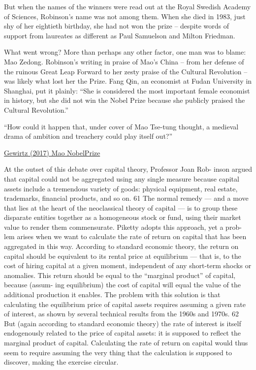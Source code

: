 \documentclass[
]{book}
\begin{document}
But when the names of the winners were read out at the Royal Swedish Academy of Sciences, Robinson's name was not among them. When she died in 1983, just shy of her eightieth birthday, she had not won the prize -- despite words of support from laureates as different as Paul Samuelson and Milton Friedman.

What went wrong? More than perhaps any other factor, one man was to blame: Mao Zedong. Robinson's writing in praise of Mao's China -- from her defense of the ruinous Great Leap Forward to her zesty praise of the Cultural Revolution -- was likely what lost her the Prize. Fang Qin, an economist at Fudan University in Shanghai, put it plainly: ``She is considered the most important female economist in history, but she did not win the Nobel Prize because she publicly praised the Cultural Revolution.''

``How could it happen that, under cover of Mao Tse-tung thought, a medieval drama of ambition and treachery could play itself out?''

\href{https://chinachannel.org/2017/12/13/fellow-travellers-tale/}{Gewirtz (2017) Mao NobelPrize}

At the outset of this debate over capital theory, Professor Joan Rob-
inson argued that capital could not be aggregated using any single
measure because capital assets include a tremendous variety of goods:
physical equipment, real estate, trademarks, financial products, and so
on. 61 The normal remedy --- and a move that lies at the heart of the
neoclassical theory of capital --- is to group these disparate entities
together as a homogeneous stock or fund, using their market value to
render them commensurate. Piketty adopts this approach, yet a prob-
lem arises when we want to calculate the rate of return on capital that
has been aggregated in this way. According to standard economic theory,
the return on capital should be equivalent to its rental price at
equilibrium --- that is, to the cost of hiring capital at a given moment,
independent of any short-term shocks or anomalies. This return
should be equal to the ``marginal product'' of capital, because (assum-
ing equilibrium) the cost of capital will equal the value of the
additional production it enables. The problem with this solution is that
calculating the equilibrium price of capital assets requires assuming a
given rate of interest, as shown by several technical results from the
1960s and 1970s. 62 But (again according to standard economic theory)
the rate of interest is itself endogenously related to the price of capital
assets: it is supposed to reflect the marginal product of capital.
Calculating the rate of return on capital would thus seem to require
assuming the very thing that the calculation is supposed to discover, making
the exercise circular.
\end{document}
